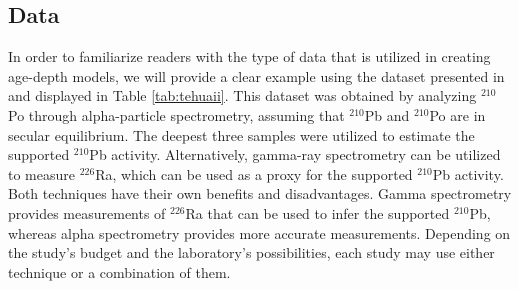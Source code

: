 \documentclass [10pt] {article}
\newcommand{\ac}{\color{red} }  %
\newcommand{\ca}{\color{black}} %
\begin{document}
\subsection{Data}

In order to familiarize readers with the type of data that is utilized in creating age-depth models, we will provide a clear example using the dataset presented in \citet{Sanchez-Cabeza2012} and displayed in Table \ref{tab:tehuaii}. This dataset was obtained by analyzing $^{210}$Po through alpha-particle spectrometry, assuming that $^{210}$Pb and $^{210}$Po are in secular equilibrium. The deepest three samples were utilized to estimate the supported $^{210}$Pb activity. Alternatively, gamma-ray spectrometry can be utilized to measure $^{226}$Ra, which can be used as a proxy for the supported $^{210}$Pb activity. Both techniques have their own benefits and disadvantages. Gamma spectrometry provides measurements of $^{226}$Ra that can be used to infer the supported $^{210}$Pb, whereas alpha spectrometry provides more accurate measurements. Depending on the study's budget and the laboratory's possibilities, each study may use either technique or a combination of them.


\end{document}
